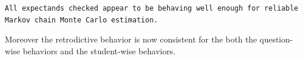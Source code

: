 \documentclass[
  letterpaper,
  DIV=11,
  numbers=noendperiod]{scrartcl}
\newenvironment{Shaded}{\begin{snugshade}}{\end{snugshade}}
\newcommand{\AttributeTok}[1]{\textcolor[rgb]{0.40,0.45,0.13}{#1}}
\newcommand{\ConstantTok}[1]{\textcolor[rgb]{0.56,0.35,0.01}{#1}}
\newcommand{\FunctionTok}[1]{\textcolor[rgb]{0.28,0.35,0.67}{#1}}
\newcommand{\NormalTok}[1]{\textcolor[rgb]{0.00,0.23,0.31}{#1}}
\newcommand{\OtherTok}[1]{\textcolor[rgb]{0.00,0.23,0.31}{#1}}
\newcommand{\SpecialCharTok}[1]{\textcolor[rgb]{0.37,0.37,0.37}{#1}}
\newcommand{\StringTok}[1]{\textcolor[rgb]{0.13,0.47,0.30}{#1}}
\begin{document}
\begin{Shaded}
\end{Shaded}

\begin{verbatim}
All expectands checked appear to be behaving well enough for reliable
Markov chain Monte Carlo estimation.
\end{verbatim}

Moreover the retrodictive behavior is now consistent for the both the
question-wise behaviors and the student-wise behaviors.
\end{document}
